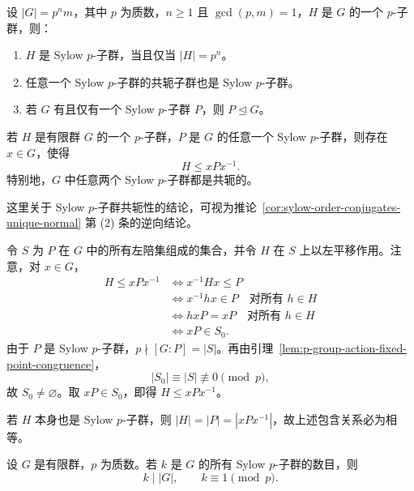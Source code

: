 \begin{corollary}\label{cor:sylow-order-conjugates-unique-normal}
设 $|G|=p^nm$，其中 $p$ 为质数，$n\geq1$ 且 $\gcd(p,m)=1$，$H$ 是 $G$ 的一个 $p$-子群，则：
\begin{enumerate}[label=(\arabic*)]
  \item $H$ 是 Sylow $p$-子群，当且仅当 $|H|=p^n$。
  \item 任意一个 Sylow $p$-子群的共轭子群也是 Sylow $p$-子群。
  \item 若 $G$ 有且仅有一个 Sylow $p$-子群 $P$，则 $P\trianglelefteq G$。
\end{enumerate}
\end{corollary}

\begin{theorem}[第二 Sylow 定理]\label{thm:second-sylow}
若 $H$ 是有限群 $G$ 的一个 $p$-子群，$P$ 是 $G$ 的任意一个 Sylow $p$-子群，则存在 $x\in G$，使得
\[
  H\leq xPx^{-1}.
\]
特别地，$G$ 中任意两个 Sylow $p$-子群都是共轭的。
\end{theorem}

\begin{purplenote}
这里关于 Sylow $p$-子群共轭性的结论，可视为推论~\ref{cor:sylow-order-conjugates-unique-normal} 第 (2) 条的逆向结论。
\end{purplenote}

\begin{purpleproof}
令 $S$ 为 $P$ 在 $G$ 中的所有左陪集组成的集合，并令 $H$ 在 $S$ 上以左平移作用。注意，对 $x\in G$，
\[
  \begin{aligned}
    H\leq xPx^{-1}
      &\Longleftrightarrow x^{-1}Hx\leq P\\
      &\Longleftrightarrow x^{-1}hx\in P\quad\text{对所有 }h\in H\\
      &\Longleftrightarrow hxP=xP\quad\text{对所有 }h\in H\\
      &\Longleftrightarrow xP\in S_0.
  \end{aligned}
\]
由于 $P$ 是 Sylow $p$-子群，$p\nmid[G:P]=|S|$。再由引理~\ref{lem:p-group-action-fixed-point-congruence}，
\[
  |S_0|\equiv|S|\not\equiv0\pmod p,
\]
故 $S_0\ne\varnothing$。取 $xP\in S_0$，即得 $H\leq xPx^{-1}$。

若 $H$ 本身也是 Sylow $p$-子群，则 $|H|=|P|=|xPx^{-1}|$，故上述包含关系必为相等。
\end{purpleproof}

\begin{theorem}[第三 Sylow 定理]\label{thm:third-sylow}
设 $G$ 是有限群，$p$ 为质数。若 $k$ 是 $G$ 的所有 Sylow $p$-子群的数目，则
\[
  k\mid |G|,\qquad k\equiv1\pmod p.
\]
\end{theorem}

